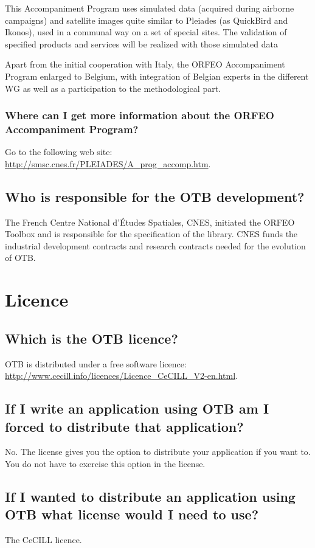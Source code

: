 This Accompaniment Program uses simulated data (acquired during airborne campaigns) and satellite images quite similar to Pleiades (as QuickBird and Ikonos), used in a communal way on a set of special sites. The validation of specified products and services will be realized with those simulated data

Apart from the initial cooperation with Italy, the ORFEO Accompaniment
Program enlarged to Belgium, with integration of Belgian experts in
the different WG as well as a participation to the methodological
part.

\subsubsection{Where can I get more information about the ORFEO
  Accompaniment Program?}
Go to the following web site:
\url{http://smsc.cnes.fr/PLEIADES/A_prog_accomp.htm}.

\subsection{Who is responsible for the OTB development?}
The French Centre National d'\'Etudes Spatiales, CNES, initiated the ORFEO
Toolbox and is responsible for the specification of the library. CNES
funds the industrial development contracts and research contracts
needed for the evolution of OTB.

\section{Licence}
\subsection{Which is the OTB licence?}
OTB is distributed under a free software licence:\\
\url{http://www.cecill.info/licences/Licence_CeCILL_V2-en.html}.


\subsection{If I write an application using OTB am I forced to distribute that application?}
No. The license gives you the option to distribute your application if
you want to. You do not have to exercise this option in the license.

\subsection{If I wanted to distribute an application using OTB what license would I need to use?}
    The CeCILL licence.

